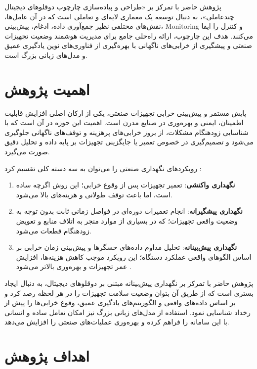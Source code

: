 پژوهش حاضر با تمرکز بر «طراحی و پیاده‌سازی چارچوب دوقلوهای دیجیتال چندعاملی»، به دنبال توسعه یک معماری لایه‌ای و تعاملی است که در آن عامل‌ها، نقش‌های مختلفی نظیر جمع‌آوری داده، ادغام، پیش‌بینی، \gls{Monitoring} و کنترل را ایفا می‌کنند. هدف این چارچوب، ارائه راه‌حلی جامع برای مدیریت هوشمند وضعیت تجهیزات صنعتی و پیشگیری از خرابی‌های ناگهانی با بهره‌گیری از فناوری‌های نوین یادگیری عمیق و مدل‌های زبانی بزرگ است.
  


\section{اهمیت پژوهش}

پایش مستمر و پیش‌بینی خرابی تجهیزات صنعتی، یکی از ارکان اصلی افزایش قابلیت اطمینان، ایمنی و بهره‌وری در صنایع مدرن است. اهمیت این حوزه در آن است که با شناسایی زودهنگام مشکلات، از بروز خرابی‌های پرهزینه و توقف‌های ناگهانی جلوگیری می‌شود و تصمیم‌گیری در خصوص تعمیر یا جایگزینی تجهیزات بر پایه داده و تحلیل دقیق صورت می‌گیرد.

رویکردهای نگهداری صنعتی را می‌توان به سه دسته کلی تقسیم کرد \cite{ismail2025systematic}:
\begin{enumerate}
	\item \textbf{نگهداری واکنشی}: تعمیر تجهیزات پس از وقوع خرابی؛ این روش اگرچه ساده است، اما باعث توقف طولانی و هزینه‌های بالا می‌شود.
	\item \textbf{نگهداری پیشگیرانه}: انجام تعمیرات دوره‌ای در فواصل زمانی ثابت بدون توجه به وضعیت واقعی تجهیزات؛ که در بسیاری از موارد منجر به اتلاف منابع و تعویض زودهنگام قطعات می‌شود.
	\item \textbf{نگهداری پیش‌بینانه}: تحلیل مداوم داده‌های حسگرها و پیش‌بینی زمان خرابی بر اساس الگوهای واقعی عملکرد دستگاه؛ این رویکرد موجب کاهش هزینه‌ها، افزایش عمر تجهیزات و بهره‌وری بالاتر می‌شود \cite{rojek2023artificial}.
\end{enumerate}
پژوهش حاضر با تمرکز بر نگهداری پیش‌بینانه مبتنی بر دوقلوهای دیجیتال، به دنبال ایجاد بستری است که از طریق آن بتوان وضعیت سلامت تجهیزات را در هر لحظه رصد کرد و بر اساس داده‌های واقعی و الگوریتم‌های یادگیری عمیق، وقوع خرابی‌ها را پیش از رخداد شناسایی نمود. استفاده از مدل‌های زبانی بزرگ نیز امکان تعامل ساده و انسانی با این سامانه را فراهم کرده و بهره‌وری عملیات‌های صنعتی را افزایش می‌دهد.



\section{اهداف پژوهش}


